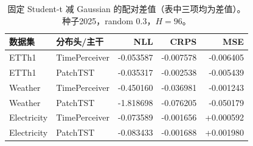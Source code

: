 \begin{table}[t]
\centering\small
\caption{固定 Student-t 减 Gaussian 的配对差值（表中三项均为差值）。种子2025，random 0.3，$H=96$。}\label{tab:backbone}
\begin{tabular}{llrrr}
\toprule
数据集 & 分布头/主干 & NLL & CRPS & MSE \\
\midrule
ETTh1 & TimePerceiver & -0.053587 & -0.007578 & -0.006405 \\
ETTh1 & PatchTST & -0.035317 & -0.002538 & -0.005439 \\
Weather & TimePerceiver & -0.450160 & -0.036981 & -0.001243 \\
Weather & PatchTST & -1.818698 & -0.076205 & -0.050179 \\
Electricity & TimePerceiver & -0.073589 & -0.001656 & +0.000592 \\
Electricity & PatchTST & -0.083433 & -0.001688 & +0.001980 \\
\bottomrule
\end{tabular}
\end{table}
